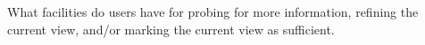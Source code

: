 

What facilities do users have for probing for more information, refining the current view, and/or marking the current view as sufficient.